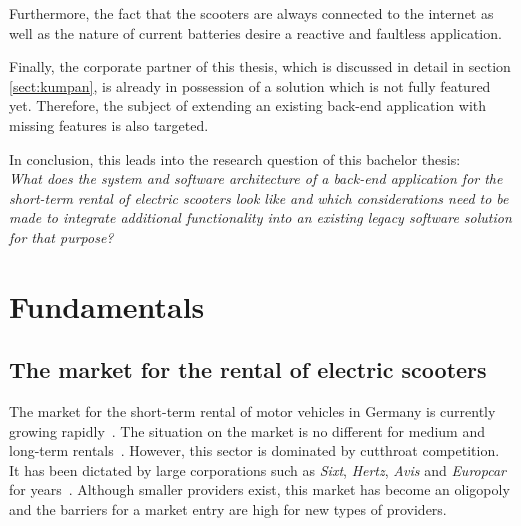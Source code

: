 \documentclass[12pt,a4paper,twoside]{report}
\begin{document}
Furthermore, the fact that the scooters are always connected to the internet
as well as the nature of current batteries desire a reactive and faultless application.

Finally, the corporate partner of this thesis, which is discussed in detail
in section \ref{sect:kumpan}, is already in possession of a solution which is not fully featured yet.
Therefore, the subject of extending an existing back-end application with missing features is also targeted.

In conclusion, this leads into the research question of this bachelor thesis:\\
\emph{What does the system and software architecture of a back-end application
for the short-term rental of electric scooters look like and which considerations
need to be made to integrate additional functionality into an
existing legacy software solution for that purpose?}



\chapter{Fundamentals} \label{chap:fundamentals}



\section{The market for the rental of electric scooters} \label{sect:electric-scooter-market}

The market for the short-term rental of motor vehicles in Germany
is currently growing rapidly~\cite{bundesverband-carsharing-statistics}.
The situation on the market is no different for medium and long-term rentals~\cite{sparkasse-kfz-vermietung}.
However, this sector is dominated by cutthroat competition.
It has been dictated by large corporations such as \textit{Sixt}, \textit{Hertz},
\textit{Avis} and \textit{Europcar} for years~\cite{sparkasse-kfz-vermietung}.
Although smaller providers exist, this market has become an oligopoly and
the barriers for a market entry are high for new types of providers.
\end{document}
